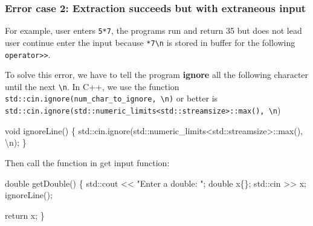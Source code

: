 \documentclass[
  letterpaper,
  DIV=11,
  numbers=noendperiod]{scrreprt}
\newenvironment{Shaded}{\begin{snugshade}}{\end{snugshade}}
\newcommand{\ErrorTok}[1]{\textcolor[rgb]{0.68,0.00,0.00}{#1}}
\newcommand{\FunctionTok}[1]{\textcolor[rgb]{0.28,0.35,0.67}{#1}}
\newcommand{\NormalTok}[1]{\textcolor[rgb]{0.00,0.23,0.31}{#1}}
\newcommand{\SpecialCharTok}[1]{\textcolor[rgb]{0.37,0.37,0.37}{#1}}
\newcommand{\StringTok}[1]{\textcolor[rgb]{0.13,0.47,0.30}{#1}}
\begin{document}
\hypertarget{error-case-2-extraction-succeeds-but-with-extraneous-input}{%
\subsubsection{Error case 2: Extraction succeeds but with extraneous
input}\label{error-case-2-extraction-succeeds-but-with-extraneous-input}}

For example, user enters \texttt{5*7}, the programs run and return 35
but does not lead user continue enter the input because
\texttt{*7\textbackslash{}n} is stored in buffer for the following
\texttt{operator\textgreater{}\textgreater{}}.

To solve this error, we have to tell the program \textbf{ignore} all the
following character until the next \texttt{\textbackslash{}n}. In C++,
we use the function
\texttt{std::cin.ignore(num\_char\_to\_ignore,\ \textbackslash{}n)} or
better is
\texttt{std::cin.ignore(std::numeric\_limits\textless{}std::streamsize\textgreater{}::max(),\ \textquotesingle{}\textbackslash{}n})

\begin{Shaded}
\begin{Highlighting}[]
\NormalTok{void }\FunctionTok{ignoreLine}\NormalTok{()}
\NormalTok{\{}
\NormalTok{    std}\SpecialCharTok{::}\FunctionTok{cin.ignore}\NormalTok{(std}\SpecialCharTok{::}\NormalTok{numeric\_limits}\SpecialCharTok{\textless{}}\NormalTok{std}\SpecialCharTok{::}\NormalTok{streamsize}\SpecialCharTok{\textgreater{}}\ErrorTok{::}\FunctionTok{max}\NormalTok{(), }\StringTok{\textquotesingle{}}\SpecialCharTok{\textbackslash{}n}\StringTok{\textquotesingle{}}\NormalTok{);}
\NormalTok{\}}
\end{Highlighting}
\end{Shaded}

Then call the function in get input function:

\begin{Shaded}
\begin{Highlighting}[]
\NormalTok{double }\FunctionTok{getDouble}\NormalTok{()}
\NormalTok{\{}
\NormalTok{    std}\SpecialCharTok{::}\NormalTok{cout }\SpecialCharTok{\textless{}}\ErrorTok{\textless{}} \StringTok{"Enter a double: "}\NormalTok{;}
\NormalTok{    double x\{\};}
\NormalTok{    std}\SpecialCharTok{::}\NormalTok{cin }\SpecialCharTok{\textgreater{}}\ErrorTok{\textgreater{}}\NormalTok{ x;}
    \FunctionTok{ignoreLine}\NormalTok{();}
    
\NormalTok{    return x;}
\NormalTok{\}}
\end{Highlighting}
\end{Shaded}
\end{document}
